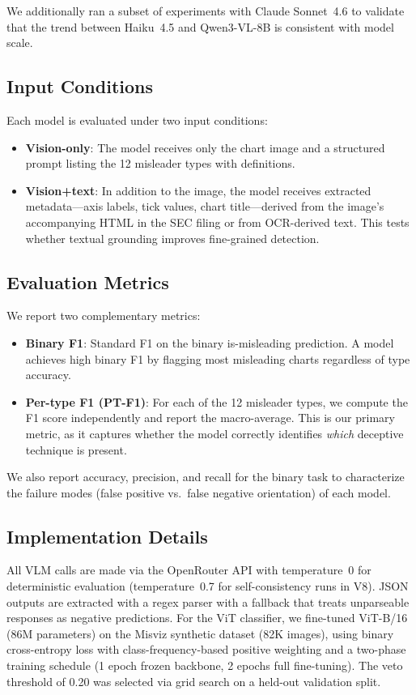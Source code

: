 We additionally ran a subset of experiments with Claude Sonnet~4.6 to validate that the trend between Haiku~4.5 and Qwen3-VL-8B is consistent with model scale.

\subsection{Input Conditions}
\label{sec:conditions}

Each model is evaluated under two input conditions:

\begin{itemize}[nosep]
  \item \textbf{Vision-only}: The model receives only the chart image and a structured prompt listing the 12 misleader types with definitions.
  \item \textbf{Vision+text}: In addition to the image, the model receives extracted metadata---axis labels, tick values, chart title---derived from the image's accompanying HTML in the SEC filing or from OCR-derived text. This tests whether textual grounding improves fine-grained detection.
\end{itemize}

\subsection{Evaluation Metrics}
\label{sec:metrics}

We report two complementary metrics:

\begin{itemize}[nosep]
  \item \textbf{Binary F1}: Standard F1 on the binary is-misleading prediction. A model achieves high binary F1 by flagging most misleading charts regardless of type accuracy.
  \item \textbf{Per-type F1 (PT-F1)}: For each of the 12 misleader types, we compute the F1 score independently and report the macro-average. This is our primary metric, as it captures whether the model correctly identifies \textit{which} deceptive technique is present.
\end{itemize}

We also report accuracy, precision, and recall for the binary task to characterize the failure modes (false positive vs.\ false negative orientation) of each model.

\subsection{Implementation Details}
\label{sec:impl}

All VLM calls are made via the OpenRouter API with temperature~0 for deterministic evaluation (temperature~0.7 for self-consistency runs in V8). JSON outputs are extracted with a regex parser with a fallback that treats unparseable responses as negative predictions. For the ViT classifier, we fine-tuned ViT-B/16~\cite{dosovitskiy2021vit} (86M parameters) on the Misviz synthetic dataset (82K images), using binary cross-entropy loss with class-frequency-based positive weighting and a two-phase training schedule (1 epoch frozen backbone, 2 epochs full fine-tuning). The veto threshold of 0.20 was selected via grid search on a held-out validation split.
